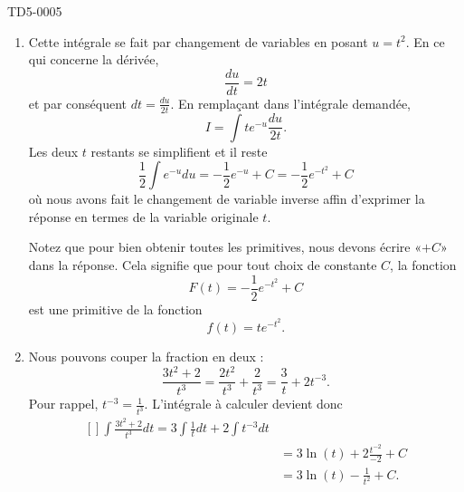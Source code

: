 
\begin{corrige}{TD5-0005}

	\begin{enumerate}
		\item
			Cette intégrale se fait par changement de variables en posant $u=t^2$. En ce qui concerne la dérivée,
			\begin{equation}
				\frac{ du }{ dt }=2t
			\end{equation}
			et par conséquent $dt=\frac{ du }{ 2t }$. En remplaçant dans l'intégrale demandée,
			\begin{equation}
				I=\int t e^{-u}\frac{ du }{ 2t }.
			\end{equation}
			Les deux $t$ restants se simplifient et il reste
			\begin{equation}
				\frac{ 1 }{2}\int e^{-u}du=-\frac{1 }{2} e^{-u}+C=-\frac{ 1 }{2} e^{-t^2}+C
			\end{equation}
			où nous avons fait le changement de variable inverse affin d'exprimer la réponse en termes de la variable originale $t$.

			Notez que pour bien obtenir toutes les primitives, nous devons écrire «$+C$» dans la réponse. Cela signifie que pour tout choix de constante $C$, la fonction
			\begin{equation}
				F(t)=-\frac{ 1 }{2} e^{-t^2}+C
			\end{equation}
			est une primitive de la fonction
			\begin{equation}
				f(t)=t e^{-t^2}.
			\end{equation}
		\item
			Nous pouvons couper la fraction en deux :
			\begin{equation}
				\frac{ 3t^2+2 }{ t^3 }=\frac{ 2t^2 }{ t^3 }+\frac{ 2 }{ t^3 }=\frac{ 3 }{ t }+2t^{-3}.
			\end{equation}
			Pour rappel, $t^{-3}=\frac{1}{ t^3 }$. L'intégrale à calculer devient donc
			\begin{equation}
				\begin{aligned}[]
					\int \frac{ 3t^2+2 }{ t^3 }dt=3\int\frac{1}{ t }dt+2\int t^{-3}dt\\
					&=3\ln(t)+2\frac{ t^{-2} }{ -2 }+C\\
					&=3\ln(t)-\frac{1}{ t^2 }+C.
				\end{aligned}
			\end{equation}
	\end{enumerate}

\end{corrige}
